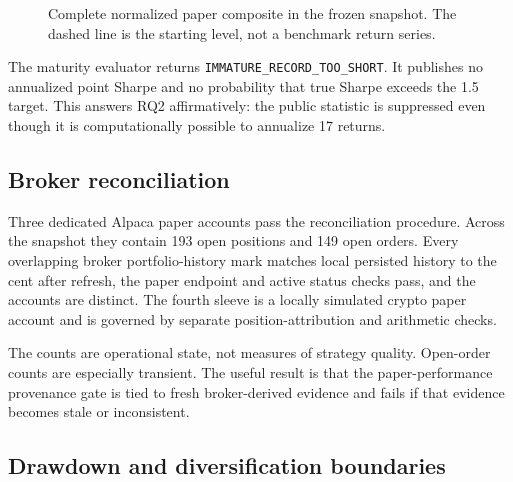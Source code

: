 \documentclass[11pt]{article}
\newcommand{\status}[1]{\texttt{#1}}
\begin{document}
\begin{figure}[H]
\centering
{}
\caption{Complete normalized paper composite in the frozen snapshot. The dashed line is the starting level, not a benchmark return series.}
\label{fig:curve}
\end{figure}

The maturity evaluator returns \status{IMMATURE\_RECORD\_TOO\_SHORT}. It publishes no annualized point Sharpe and no probability that true Sharpe exceeds the 1.5 target. This answers RQ2 affirmatively: the public statistic is suppressed even though it is computationally possible to annualize 17 returns.

\subsection{Broker reconciliation}

Three dedicated Alpaca paper accounts pass the reconciliation procedure. Across the snapshot they contain 193 open positions and 149 open orders. Every overlapping broker portfolio-history mark matches local persisted history to the cent after refresh, the paper endpoint and active status checks pass, and the accounts are distinct. The fourth sleeve is a locally simulated crypto paper account and is governed by separate position-attribution and arithmetic checks.

The counts are operational state, not measures of strategy quality. Open-order counts are especially transient. The useful result is that the paper-performance provenance gate is tied to fresh broker-derived evidence and fails if that evidence becomes stale or inconsistent.

\subsection{Drawdown and diversification boundaries}
\end{document}

